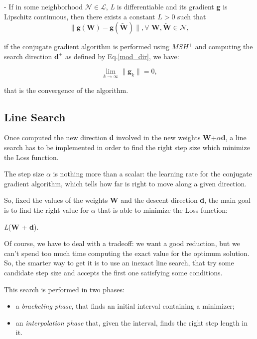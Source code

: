 			\begin{asu} - \label{as:2}
				If in some neighborhood $\mathcal{N} \in \mathcal{L}$, \textit{L} is differentiable and its gradient \textbf{g} is Lipschitz continuous, then there exists a constant $ L > 0 $ such that
				\begin{equation}
				\label{ass2}
				  \|\textbf{g}(\textbf{W})-\textbf{g}(\widetilde{\textbf{W}})\|, \forall \textbf{ W},\widetilde{\textbf{W}} \in \mathcal{N},
				\end{equation}
			\end{asu}
			if the conjugate gradient algorithm is performed using $MSH^+$ and computing the search direction $\textbf{d}^+$ as defined by Eq.\ref{mod_dir}, we have:

			\begin{equation}
			\label{conv_mhs}
			  \lim_{k \to \infty} \|\textbf{g}_k\| = 0,
			\end{equation}

			that is the convergence of the algorithm.


		\subsection{Line Search}
		\label{sub:line_search}
			Once computed the new direction \textbf{d} involved in the new weights \textbf{W}+$\alpha$\textbf{d}, a line search has to be implemented in order to find the right step size which minimize the Loss function.

			The step size $\alpha$ is nothing more than a scalar: the learning rate for the conjugate gradient algorithm, which tells how far is right to move along a given direction.

			So, fixed the values of the weights \textbf{W} and the descent direction \textbf{d}, the main goal is to find the right value for $\alpha$ that is able to minimize the Loss function:

			 \begin{mini}
			   {\alpha}{\textit{L}(\textbf{W} + \alpha\textbf{d}).}{}{}
			 \end{mini}

			Of course, we have to deal with a tradeoff: we want a good reduction, but we can't spend too much time computing the exact value for the optimum solution. So, the smarter way to get it is to use an inexact line search, that try some candidate step size and accepts the first one satisfying some conditions.

			This search is performed in two phases:
			\begin{itemize}
			\item a \textit{bracketing phase}, that finds an initial interval containing a minimizer;
			\item an \textit{interpolation phase} that, given the interval, finds the right step length in it.
			\end{itemize}

